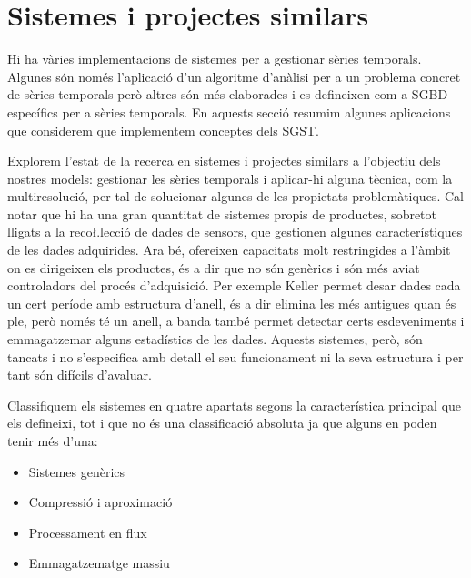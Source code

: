 
\section{Sistemes i projectes similars}




Hi ha vàries implementacions de sistemes per a gestionar sèries
temporals. Algunes són només l'aplicació d'un algoritme d'anàlisi per
a un problema concret de sèries temporals però altres són més
elaborades i es defineixen com a \gls{SGBD} específics per a sèries
temporals. En aquests secció resumim algunes aplicacions que
considerem que implementem conceptes dels \gls{SGST}.



Explorem l'estat de la recerca en sistemes i projectes
similars a l'objectiu dels nostres models: gestionar les sèries
temporals i aplicar-hi alguna tècnica, com la multiresolució, per tal
de solucionar algunes de les propietats problemàtiques. Cal notar que
hi ha una gran quantitat de sistemes propis de productes, sobretot
lligats a la reco\l.lecció de dades de sensors, que gestionen algunes
característiques de les dades adquirides. Ara bé, ofereixen capacitats
molt restringides a l'àmbit on es dirigeixen els productes, és a dir
que no són genèrics i són més aviat controladors del procés
d'adquisició. Per exemple Keller \parencite{keller} permet desar dades
cada un cert període amb estructura d'anell, és a dir elimina les més
antigues quan és ple, però només té un anell, a banda també permet
detectar certs esdeveniments i emmagatzemar alguns estadístics de les
dades.  Aquests sistemes, però, són tancats i no s'especifica amb
detall el seu funcionament ni la seva estructura i per tant són
difícils d'avaluar.






Classifiquem els sistemes en quatre apartats segons la característica
principal que els defineixi, tot i que no és una classificació
absoluta ja que alguns en poden tenir més d'una:
\begin{itemize}
\item Sistemes genèrics
\item Compressió i aproximació
\item Processament en flux
\item Emmagatzematge massiu
\end{itemize}






